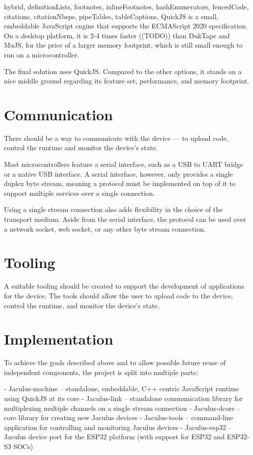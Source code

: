 \begin{markdown*}{%
  hybrid,
  definitionLists,
  footnotes,
  inlineFootnotes,
  hashEnumerators,
  fencedCode,
  citations,
  citationNbsps,
  pipeTables,
  tableCaptions,
}
QuickJS is a small, embeddable JavaScript engine that supports the ECMAScript 2020 specification. On a desktop platform, it is 2-4 times faster ((TODO)) than DukTape and MuJS, for the price of a larger memory footprint, which is still small enough to run on a microcontroller.

The final solution uses QuickJS. Compared to the other options, it stands on a nice middle ground regarding its feature set, performance, and memory footprint.

\section{Communication}

There should be a way to communicate with the device --- to upload code, control the runtime and monitor the device's state.

Most microcontrollers feature a serial interface, such as a USB to UART bridge or a native USB interface. A serial interface, however, only provides a single duplex byte stream, meaning a protocol must be implemented on top of it to support multiple services over a single connection.

Using a single stream connection also adds flexibility in the choice of the transport medium. Aside from the serial interface, the protocol can be used over a network socket, web socket, or any other byte stream connection.

\section{Tooling}

A suitable tooling should be created to support the development of applications for the device. The tools should allow the user to upload code to the device, control the runtime, and monitor the device's state.

\section{Implementation}

To achieve the goals described above and to allow possible future reuse of independent components, the project is split into multiple parts:

  - Jaculus-machine -- standalone, embeddable, C++ centric JavaScript runtime using QuickJS at its core
  - Jaculus-link -- standalone communication library for multiplexing multiple channels on a single stream connection
  - Jaculus-dcore -- core library for creating new Jaculus devices
  - Jaculus-tools -- command-line application for controlling and monitoring Jaculus devices
  - Jaculus-esp32 -- Jaculus device port for the ESP32 platform (with support for ESP32 and ESP32-S3 SOCs)



\end{markdown*}
